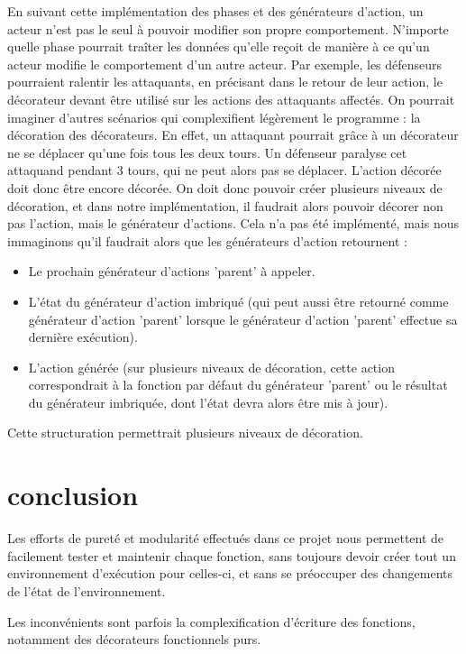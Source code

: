 \documentclass{article}
\begin{document}
En suivant cette implémentation des phases et des générateurs d'action, un acteur n'est pas le seul à pouvoir modifier son propre comportement. N'importe quelle phase pourrait traîter les données qu'elle reçoit de manière à ce qu'un acteur modifie le comportement d'un autre acteur. Par exemple, les défenseurs pourraient ralentir les attaquants, en précisant dans le retour de leur action, le décorateur devant être utilisé sur les actions des attaquants affectés.
On pourrait imaginer d'autres scénarios qui complexifient légèrement le programme : la décoration des décorateurs. En effet, un attaquant pourrait grâce à un décorateur ne se déplacer qu'une fois tous les deux tours. Un défenseur paralyse cet attaquand pendant 3 tours, qui ne peut alors pas se déplacer. L'action décorée doit donc être encore décorée. On doit donc pouvoir créer plusieurs niveaux de décoration, et dans notre implémentation, il faudrait alors pouvoir décorer non pas l'action, mais le générateur d'actions. Cela n'a pas été implémenté, mais nous immaginons qu'il faudrait alors que les générateurs d'action retournent :
\begin{itemize}
    \item Le prochain générateur d'actions 'parent' à appeler.
    \item L'état du générateur d'action imbriqué (qui peut aussi être retourné comme générateur d'action 'parent' lorsque le générateur d'action 'parent' effectue sa dernière exécution).
    \item L'action générée (sur plusieurs niveaux de décoration, cette action correspondrait à la fonction par défaut du générateur 'parent' ou le résultat du générateur imbriquée, dont l'état devra alors être mis à jour).
\end{itemize}

Cette structuration permettrait plusieurs niveaux de décoration.

\section{conclusion}

Les efforts de pureté et modularité effectués dans ce projet nous permettent de facilement tester et maintenir chaque fonction, sans toujours devoir créer tout un environnement d'exécution pour celles-ci, et sans se préoccuper des changements de l'état de l'environnement.

Les inconvénients sont parfois la complexification d'écriture des fonctions, notamment des décorateurs fonctionnels purs.
\end{document}
